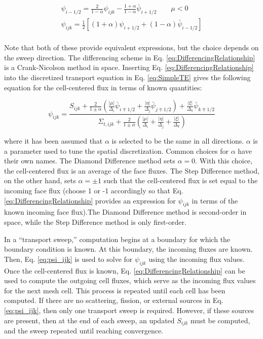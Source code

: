 \documentclass[10pt]{article}
\begin{document}
\begin{flushleft}
\begin{equation}
\begin{aligned}
\psi_{i-1/2}=\frac{2}{1-\alpha}\psi_{ijk}-\frac{1+\alpha}{1-\alpha}\bar{\psi}_{i+1/2}\quad\quad\mu <0\\
\psi_{ijk}=\frac{1}{2}\left\lbrack(1+\alpha)\psi_{i+1/2}+(1-\alpha)\bar{\psi}_{i-1/2}\right\rbrack\\
\end{aligned}
\end{equation}

Note that both of these provide equivalent expressions, but the choice depends on the sweep direction. The differencing scheme in Eq. \eqref{eq:DifferencingRelationship} is a Crank-Nicolson method in space. Inserting Eq. \eqref{eq:DifferencingRelationship} into the discretized transport equation in Eq. \eqref{eq:SimpleTE} gives the following equation for the cell-centered flux in terms of known quantities:

\begin{equation}
\label{eq:psi_ijk}
\psi_{ijk}=\frac{S_{ijk}+\frac{2}{1\pm\alpha}\left(\frac{|\mu|}{\Delta_i}\bar{\psi}_{i\mp1/2}+\frac{|\eta|}{\Delta_j}\bar{\psi}_{j\mp1/2}\right)+\frac{|\xi|}{\Delta_k}\bar{\psi}_{k\mp1/2}}{\Sigma_{t,ijk}+\frac{2}{1\pm\alpha}\left(\frac{|\mu|}{\Delta_i}+\frac{|\eta|}{\Delta_j}+\frac{|\xi|}{\Delta_k}\right)}
\end{equation}

where it has been assumed that \(\alpha\) is selected to be the same in all directions. \(\alpha\) is a parameter used to tune the spatial discretization. Common choices for \(\alpha\) have their own names. The Diamond Difference method sets \(\alpha=0\). With this choice, the cell-centered flux is an average of the face fluxes. The Step Difference method, on the other hand, sets \(\alpha=\pm1\) such that the cell-centered flux is set equal to the incoming face flux (choose 1 or -1 accordingly so that Eq. \eqref{eq:DifferencingRelationship} provides an expression for \(\psi_{ijk}\) in terms of the known incoming face flux).The Diamond Difference method is second-order in space, while the Step Difference method is only first-order. 

In a ``transport sweep,'' computation begins at a boundary for which the boundary condition is known. At this boundary, the incoming fluxes are known. Then, Eq. \eqref{eq:psi_ijk} is used to solve for \(\psi_{ijk}\) using the incoming flux values. Once the cell-centered flux is known, Eq. \eqref{eq:DifferencingRelationship} can be used to compute the outgoing cell fluxes, which serve as the incoming flux values for the next mesh cell. This process is repeated until each cell has been computed. If there are no scattering, fission, or external sources in Eq. \eqref{eq:psi_ijk}, then only one transport sweep is required. However, if these sources are present, then at the end of each sweep, an updated \(S_{ijk}\) must be computed, and the sweep repeated until reaching convergence. 


\end{flushleft}
\end{document}
